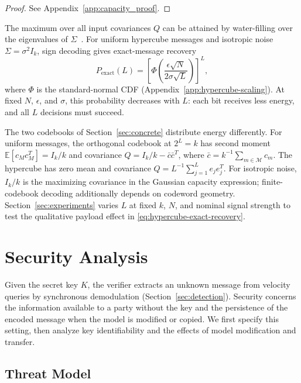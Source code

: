 \documentclass[11pt]{article}
\begin{document}
\begin{proof}
See Appendix~\ref{app:capacity_proof}.
\end{proof}

The maximum over all input covariances $Q$ can be attained by water-filling over the
eigenvalues of $\Sigma$~\cite{cover1999elements}. For uniform hypercube messages and isotropic noise
$\Sigma=\sigma^2 I_k$, sign decoding gives exact-message recovery
\begin{equation}\label{eq:hypercube-exact-recovery}
P_{\mathrm{exact}}(L)
=\left[\Phi\!\left(\frac{\epsilon\sqrt N}{2\sigma\sqrt L}\right)\right]^L,
\end{equation}
where $\Phi$ is the standard-normal CDF
(Appendix~\ref{app:hypercube-scaling}). At fixed $N$, $\epsilon$, and
$\sigma$, this probability decreases with $L$: each bit receives less
energy, and all $L$ decisions must succeed.

The two codebooks of Section~\ref{sec:concrete} distribute energy
differently. For uniform messages, the orthogonal codebook at $2^L=k$
has second moment $\mathbb E[c_Mc_M^T]=I_k/k$ and covariance
$Q=I_k/k-\bar c\bar c^T$, where
$\bar c=k^{-1}\sum_{m\in\mathcal M}c_m$.
The hypercube has zero mean and covariance
$Q=L^{-1}\sum_{j=1}^Le_je_j^T$.
For isotropic noise, $I_k/k$ is the maximizing covariance in the
Gaussian capacity expression; finite-codebook decoding additionally
depends on codeword geometry. Section~\ref{sec:experiments} varies $L$
at fixed $k$, $N$, and nominal signal strength to test the qualitative
payload effect in \eqref{eq:hypercube-exact-recovery}.

\section{Security Analysis}\label{sec:security_analysis}

Given the secret key $K$, the verifier extracts an unknown message from
velocity queries by synchronous demodulation (Section~\ref{sec:detection}).
Security concerns the
information available to a party without the key and the persistence
of the encoded message when the model is modified or copied. We first
specify this setting, then analyze key identifiability and the effects
of model modification and transfer.

\subsection{Threat Model}
\end{document}
